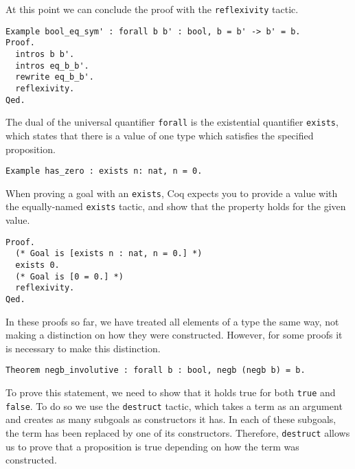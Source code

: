 At this point we can conclude the proof with the \texttt{reflexivity} tactic.

\begin{verbatim}
Example bool_eq_sym' : forall b b' : bool, b = b' -> b' = b.
Proof.
  intros b b'.
  intros eq_b_b'.
  rewrite eq_b_b'.
  reflexivity.
Qed.
\end{verbatim}

The dual of the universal quantifier \texttt{forall} is the existential quantifier
\texttt{exists}, which states that there is a value of one type which satisfies the specified
proposition.

\begin{verbatim}
Example has_zero : exists n: nat, n = 0.
\end{verbatim}

When proving a goal with an \texttt{exists}, Coq expects you to provide a value with the 
equally-named \texttt{exists} tactic, and show that the property holds for the given value.

\begin{verbatim}
Proof.
  (* Goal is [exists n : nat, n = 0.] *)
  exists 0. 
  (* Goal is [0 = 0.] *)
  reflexivity.
Qed.
\end{verbatim}


In these proofs so far, we have treated all elements of a type the same way, not making a distinction on
how they were constructed. However, for some proofs it is necessary to make this distinction.

\begin{verbatim}
Theorem negb_involutive : forall b : bool, negb (negb b) = b.
\end{verbatim}

To prove this statement, we need to show that it holds true for both \texttt{true} and 
\texttt{false}. To do so we use the \texttt{destruct} tactic, which takes a term as
an argument and creates as many subgoals as constructors it has. In each of these subgoals, the term
has been replaced by one of its constructors. Therefore, \texttt{destruct} allows us to prove
that a proposition is true depending on how the term was constructed.

